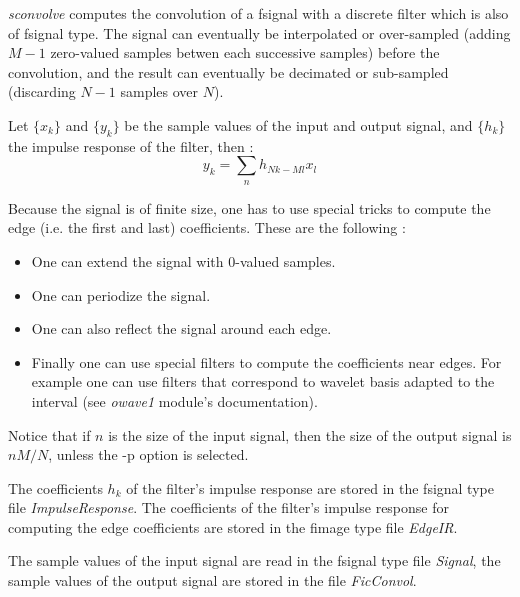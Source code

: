 
{\em sconvolve} computes the convolution of a fsignal with a discrete filter which is also of fsignal type. The signal can eventually be interpolated or over-sampled (adding $M-1$ zero-valued samples betwen each successive samples) before the convolution, and the result can eventually be decimated or sub-sampled (discarding $N-1$ samples over $N$).

Let $\{x_{k}\}$ and $\{y_{k}\}$ be the sample values of the input and output signal, and $\{h_{k}\}$ the impulse response of the filter, then :
\[
y_{k} = \sum_{n} h_{Nk-Ml} x_{l}
\]

Because the signal is of finite size, one has to use special tricks to compute the edge (i.e. the first and last) coefficients. These are the following :
\begin{itemize}
\item
One can extend the signal with \( 0 \)-valued samples.
\item
One can periodize the signal.
\item
One can also reflect the signal around each edge.
\item
Finally one can use special filters to compute the coefficients near edges. For example one can use filters that correspond to wavelet basis adapted to the interval (see {\em owave1} module's documentation). 
\end{itemize}

Notice that if $n$ is the size of the input signal, then the size of the output signal is $nM/N$, unless the -p option is selected.

The coefficients \( h_{k} \) of the filter's impulse response are stored in the fsignal type file {\em ImpulseResponse}. The coefficients of the filter's impulse response for computing the edge coefficients are stored in the fimage type file {\em EdgeIR}.

The sample values of the input signal are read in the fsignal type file {\em Signal}, the sample values of the output signal are stored in the file {\em FicConvol}.

